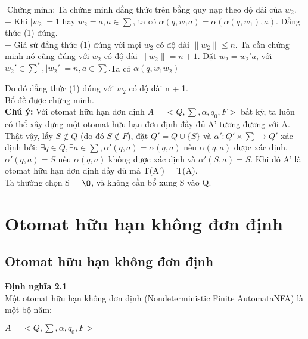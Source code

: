 \begin{flushleft}
Chứng minh: Ta chứng minh đẳng thức trên bằng quy nạp theo độ dài của $w_2$.\\
+ Khi $|w_2| = 1$ hay $w_2 = a, a \in \sum$, ta có $\alpha(q, w_1a) = \alpha(\alpha(q, w_1),a)$. Đẳng thức (1) đúng.\\
+ Giả sử đẳng thức (1) đúng với mọi $w_2$ có độ dài $\|w_2\| \le n$. Ta cần chứng minh nó cũng đúng với $w_2$ có độ dài $\|w_2\| = n + 1$.  Đặt $w_2 = w_2'a$, với $w_2' \in \sum^*, |w_2'| = n, a \in \sum. $Ta có $\alpha(q, w_1w_2)$


Do đó đẳng thức (1) đúng với $w_2$ có độ dài n + 1.\\
Bổ đề được chứng minh.\\
\textbf{Chú ý: } Với otomat hữu hạn đơn định $A = <Q, \sum, \alpha, q_0, F>$ bất kỳ, ta luôn có thể xây dựng một otomat hữu hạn đơn định đầy đủ A’ tương đương với A. \\
Thật vậy, lấy $S \not \in Q$ (do đó $S \not \in F$), đặt $Q'= Q \cup \{S\}$ và $\alpha': Q' \times \sum \to Q'$ xác định bởi: $\exists q \in Q, \exists a \in \sum, \alpha'(q, a) = \alpha(q, a)$ nếu $\alpha(q, a)$ được xác định, $\alpha'(q, a) = S$ nếu $\alpha(q, a)$ không được xác định và $\alpha'(S, a) = S$. Khi đó A' là otomat hữu hạn đơn định đầy đủ mà T(A') = T(A). \\
Ta thường chọn S = $\O$, và không cần bổ xung S vào Q.\\

\section{Otomat hữu hạn không đơn định}
\subsection{Otomat hữu hạn không đơn định}
\textbf{Định nghĩa 2.1}\\
Một otomat hữu hạn không đơn định (Nondeterministic Finite AutomataNFA) là một bộ năm:\\
\end{flushleft}
$A = <Q, \sum, \alpha, q_0, F>$\\

